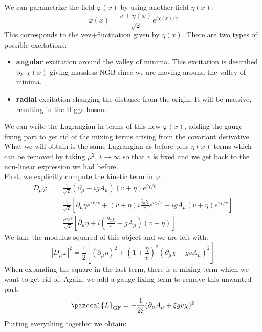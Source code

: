 \documentclass[../main.tex]{subfiles}
\begin{document}
We can parametrize the field $\varphi(x)$ by using another field $\eta(x)$:
\[
\varphi(x)=\frac{v+\eta(x)}{\sqrt{2}}e^{i\chi(x)/v}
\]
This corresponds to the vev+fluctuation given by $\eta(x)$. There are two types of possible excitations:
\begin{itemize}
    \item \textbf{angular} excitation around the valley of minima. This excitation is described by $\chi(x)$ giving massless NGB since we are moving around the valley of minima.
    \item \textbf{radial} excitation changing the distance from the origin. It will be massive, resulting in the Higgs boson.
\end{itemize}
We can write the Lagrangian in terms of this new $\varphi(x)$, adding the gauge-fixing part to get rid of the mixing terms arising from the covariant derivative. What we will obtain is the same Lagrangian as before plus $\eta(x)$ terms which can be removed by taking $\mu^2,\lambda\to\infty$ so that $v$ is fixed and we get back to the non-linear expression we had before.\\
First, we explicitly compute the kinetic term in $\varphi$:
\begin{align*}
D_\mu\varphi&=\frac{1}{\sqrt{2}}(\partial_\mu-igA_\mu)(v+\eta)e^{i\chi/v}\\
&=\frac{1}{\sqrt{2}}\left[\partial_\mu\eta e^{i\chi/v}+(v+\eta)i\frac{\partial_\mu\chi}{v}e^{i\chi/v}-igA_\mu(v+\eta)e^{i\chi/v}\right]\\
&=\frac{e^{i\chi/v}}{\sqrt{2}}\left[\partial_\mu\eta+i\left(\frac{\partial_\mu\chi}{v}-gA_\mu\right)(v+\eta)\right]
\end{align*}
We take the modulus squared of this object and we are left with:
\[
|D_\mu\varphi|^2=\frac{1}{2}\left[(\partial_\mu\eta)^2+\left(1+\frac{\eta}{v}\right)^2(\partial_\mu\chi-gvA_\mu)^2\right]
\]
When expanding the square in the last term, there is a mixing term which we want to get rid of. Again, we add a gauge-fixing term to remove this unwanted part:
\[
\pazocal{L}_{\text{GF}}=-\frac{1}{2\xi}(\partial_\mu A_\mu+\xi gv\chi)^2
\]
Putting everything together we obtain:
\end{document}
